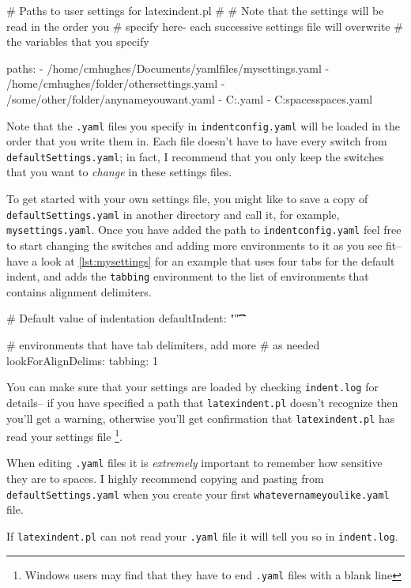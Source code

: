 \begin{yaml}[caption={\lstinline!indentconfig.yaml! (sample)},label={lst:indentconfig}]
# Paths to user settings for latexindent.pl
#
# Note that the settings will be read in the order you 
# specify here- each successive settings file will overwrite
# the variables that you specify

paths:
- /home/cmhughes/Documents/yamlfiles/mysettings.yaml
- /home/cmhughes/folder/othersettings.yaml
- /some/other/folder/anynameyouwant.yaml
- C:\Users\chughes\Documents\mysettings.yaml
- C:\Users\chughes\Desktop\test spaces\more spaces.yaml
\end{yaml}
 	 	 	 	 	
Note that the \lstinline!.yaml! files you specify in \lstinline!indentconfig.yaml!
will be loaded in the order that you write them in. Each file doesn't have 
to have every switch from \lstinline!defaultSettings.yaml!; in fact, I recommend 
that you only keep the switches that you want to \emph{change} in these 
settings files.
 	 	 	 	 	
To get started with your own settings file, you might like to save a copy of 
\lstinline!defaultSettings.yaml! in another directory and call it, for 
example, \lstinline!mysettings.yaml!. Once you have added the path to \lstinline!indentconfig.yaml!
feel free to start changing the switches and adding more environments to it 
as you see fit-- have a look at \cref{lst:mysettings} for an example 
that uses four tabs for the default indent, and adds the \lstinline!tabbing!
environment to the list of environments that contains alignment delimiters.
 	 	 	 	 	
\begin{yaml}[caption={\lstinline!mysettings.yaml! (example)},label={lst:mysettings}]
# Default value of indentation
defaultIndent: "\t\t\t\t"

# environments that have tab delimiters, add more 
# as needed
lookForAlignDelims:
   tabbing: 1
\end{yaml}
 	 	 	 	 	
You can make sure that your settings are loaded by checking \lstinline!indent.log!
for details-- if you have specified a path that \lstinline!latexindent.pl! doesn't 
recognize then you'll get a warning, otherwise you'll get confirmation that 
\lstinline!latexindent.pl! has read your settings file \footnote{Windows users 
	may find that they have to end \lstinline!.yaml! files with a blank line}.
 	 	 	 	 	
\begin{warning}
	When editing \lstinline!.yaml! files it is \emph{extremely} important 
	to remember how sensitive they are to spaces. I highly recommend copying 
	and pasting from \lstinline!defaultSettings.yaml! when you create your
	first \lstinline!whatevernameyoulike.yaml! file.
													
	If \lstinline!latexindent.pl! can not read your \lstinline!.yaml! file it 
	will tell you so in \lstinline!indent.log!.
\end{warning}
 	 	 	 	 	
